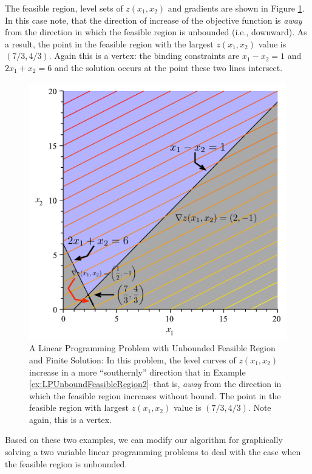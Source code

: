\begin{solution}
The feasible region, level sets of $z(x_1,x_2)$ and gradients are shown in Figure \ref{fig:LPUnboundFeasibleRegion2}. In this case note, that the direction of increase of the objective function is \textit{away} from the direction in which the feasible region is unbounded (i.e., downward). As a result, the point in the feasible region with the largest $z(x_1,x_2)$ value is $(7/3,4/3)$. Again this is a vertex: the binding constraints are $x_1 - x_2 = 1$ and $2x_1 + x_2 = 6$ and the solution occurs at the point these two lines intersect.
\begin{figure}[H]%
\centering
\includegraphics[scale=0.4]{UnboundedFeasibleRegionFiniteSolution.pdf}
\caption{A Linear Programming Problem with Unbounded Feasible Region and Finite Solution: In this problem, the level curves of $z(x_1,x_2)$ increase in a more ``southernly'' direction that in Example \ref{ex:LPUnboundFeasibleRegion2}--that is, \textit{away} from the direction in which the feasible region increases without bound. The point in the feasible region with largest $z(x_1,x_2)$ value is $(7/3,4/3)$. Note again, this is a vertex.}
\label{fig:LPUnboundFeasibleRegion2}
\end{figure}
\label{ex:LPUnboundFeasibleRegion2}
\end{solution}
Based on these two examples, we can modify our algorithm for graphically solving a two variable linear programming problems to deal with the case when the feasible region is unbounded.
